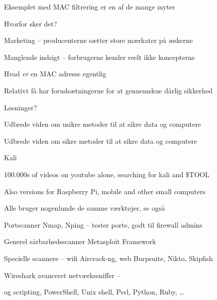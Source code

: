 \documentclass[Screen16to9,17pt]{foils}
\begin{document}

\begin{list1}
\item Eksemplet med MAC filtrering er en af de mange myter
\item Hvorfor sker det?
\item Marketing -- producenterne sætter store mærkater på æskerne
\item Manglende indsigt -- forbrugerne kender reelt ikke koncepterne
\item Hvad \emph{er} en MAC adresse egentlig
\item Relativt få har forudsætningerne for at gennemskue dårlig sikkerhed
\item Løsninger?

\item Udbrede viden om usikre metoder til at sikre data og computere
\item Udbrede viden om sikre metoder til at sikre data og computere
\end{list1}








\begin{list1}
\item  Kali 
\item 100.000s of videos on youtube alone, searching for kali and \$TOOL
\item Also versions for Raspberry Pi, mobile and other small computers
\end{list1}



\begin{list2}
\item Alle bruger nogenlunde de samme værktøjer, se også 
\item Portscanner Nmap, Nping -- tester porte, godt til firewall admins 
\item Generel sårbarhedsscanner Metasploit Framework 
\item Specielle scannere -- wifi Aircrack-ng, web Burpsuite, Nikto, Skipfish 
\item Wireshark avanceret netværkssniffer -- 
\item og scripting, PowerShell, Unix shell, Perl, Python, Ruby, \ldots
\end{list2}
\end{document}
